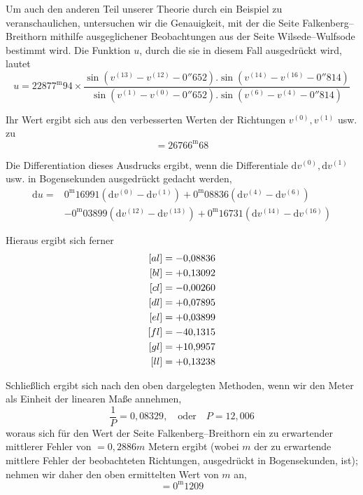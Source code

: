 Um auch den anderen Teil unserer Theorie durch ein Beispiel zu veranschaulichen, untersuchen wir die Genauigkeit, mit der die Seite Falkenberg–Breithorn mithilfe ausgeglichener Beobachtungen aus der Seite Wilsede–Wulfsode bestimmt wird. Die Funktion \(u\), durch die sie in diesem Fall ausgedrückt wird, lautet
\[
u=22877^{\mathrm m}94\times\frac{\sin(v^{(13)}-v^{(12)}-0''652).\sin(v^{(14)}-v^{(16)}-0''814)}{\sin(v^{(1)}-v^{(0)}-0''652).\sin(v^{(6)}-v^{(4)}-0''814)}
\]

Ihr Wert ergibt sich aus den verbesserten Werten der Richtungen \(v^{(0)},v^{(1)}\) usw. zu
\[
=26766^{\mathrm m}68
\]

Die Differentiation dieses Ausdrucks ergibt, wenn die Differentiale \(\mathrm dv^{(0)},\allowbreak\mathrm dv^{(1)}\) usw. in Bogensekunden ausgedrückt gedacht werden,
\[
\begin{aligned}
\mathrm du={}&0^{\mathrm m}16991(\mathrm dv^{(0)}-\mathrm dv^{(1)})+0^{\mathrm m}08836(\mathrm dv^{(4)}-\mathrm dv^{(6)})\\
&-0^{\mathrm m}03899(\mathrm dv^{(12)}-\mathrm dv^{(13)})+0^{\mathrm m}16731(\mathrm dv^{(14)}-\mathrm dv^{(16)})
\end{aligned}
\]

Hieraus ergibt sich ferner
\[
\begin{aligned}\relax
[al]&=-0{,}08836\\
[bl]&=+0{,}13092\\
[cl]&=-0{,}00260\\
[dl]&=+0{,}07895\\
[el]&=+0{,}03899\\
[fl]&=-40{,}1315\\
[gl]&=+10{,}9957\\
[ll]&=+0{,}13238
\end{aligned}
\]

Schließlich ergibt sich nach den oben dargelegten Methoden, wenn wir den Meter als Einheit der linearen Maße annehmen,
\[
\frac1P=0{,}08329,\quad\text{oder}\quad P=12{,}006
\]
woraus sich für den Wert der Seite Falkenberg–Breithorn ein zu erwartender mittlerer Fehler von \(=0{,}2886m\) Metern ergibt (wobei \(m\) der zu erwartende mittlere Fehler der beobachteten Richtungen, ausgedrückt in Bogensekunden, ist); nehmen wir daher den oben ermittelten Wert von \(m\) an,
\[
=0^{\mathrm m}1209
\]

